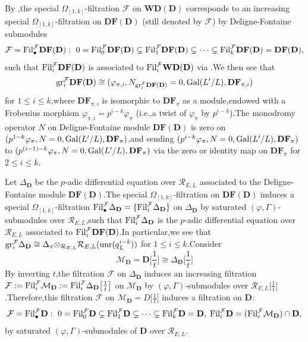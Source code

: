 \documentclass[SecEq,CM,GP]{degruyter-crelle} %
\theoremstyle{plain}
\newcommand{\df}{{\mathbf{DF}}}
\newcommand{\Dpik}{{\mathbf{D}}}
\newcommand{\fil}{{\rm Fil}}
\newcommand{\gal}{{\rm Gal}}
\newcommand{\gr}{{\rm gr}}
\newcommand{\omepik}{\Omega_{[1,k]}}
\newcommand{\tee}{{{\otimes}_{\cR_{E,L}}}}
\newcommand{\unr}{{\rm unr}}
\newcommand{\wdre}{{\textbf{WD}}}
\newcommand{\cR}{\mathcal R}
\newcommand{\cM}{\mathcal M}
\newcommand{\cF}{\mathcal F}
\begin{document}
By \cite[Proposition 4.1]{breuil2007first},\;the special $\omepik$-filtration $\cF$ on $\wdre(\Dpik)$ corresponds to an increasing  special  $\omepik$-filtration on $\df(\Dpik)$ (still denoted by $\cF$)  by Deligne-Fontaine submodules
\[\cF=\fil_{\bullet}^{\cF}\df(\Dpik): \ 0 =\fil_0^{\cF} \df(\Dpik) \subsetneq \fil_1^{\cF} \df(\Dpik) \subsetneq \cdots \subsetneq \fil_{k}^{\cF} \df(\Dpik)=\df(\Dpik),\]
such that $\fil_i^{\cF} \df(\Dpik)$ is associated to $\fil_i^{\cF} \wdre(\Dpik)$ via 
\cite[Proposition 4.1]{breuil2007first}.\;We then  see that \[\gr^{\cF}_i\df(\Dpik)\cong (\varphi_{\pi,i},N_{\gr^{\cF}_i\df(\Dpik)}=0,\gal(L'/L),\df_{\pi,i})\] for $1\leqslant i\leqslant k$,\;where $\df_{\pi,i}$ is isomorphic to $\df_\pi$ as a module,\;endowed with a Frobenius morphism $\varphi_{\pi,i}=p^{i-k}\varphi_\pi$ (i.e.,\;a twist of $\varphi_\pi$ by $p^{i-k}$).\;The monodromy operator $N$ on Deligne-Fontaine module $\df(\Dpik)$ is zero on  $(p^{1-k}\varphi_\pi,N=0,\gal(L'/L),\df_\pi)$,\;and sending $(p^{i-k}\varphi_\pi,N=0,\gal(L'/L),\df_\pi)$ to
$(p^{(i-1)-k}\varphi_\pi,N=0,\gal(L'/L),\df_\pi)$ via the zero or identity map on $\df_\pi$ for  $2\leq i\leq k$.\;




Let  ${\Delta_\Dpik}$  be the $p$-adic differential equation over $\cR_{E,L}$ associated to the Deligne-Fontaine module $\df(\Dpik)$.\;The special $\omepik$-filtration on $\df(\Dpik)$ induces a special  $\omepik$-filtration $\fil_{\bullet}^{\cF}{\Delta_\Dpik}=\{\fil_{i}^{\cF}{\Delta_\Dpik}\}$ on ${\Delta_\Dpik}$ by saturated $(\varphi,\Gamma)$-submodules over $\cR_{E,L}$,\;such that $\fil_{i}^{\cF}{\Delta_\Dpik}$ is the $p$-adic differential equation over $\cR_{E,L}$ associated to $\fil_i^{\cF} \df(\Dpik)$.\;In particular,\;we see that $\gr^{\cF}_i{\Delta_\Dpik}\cong {\Delta_\pi}\tee \cR_{E,L}(\unr(q_L^{i-k}))$ for $1\leqslant i\leqslant k$.\;Consider
\[\cM_\Dpik=\Dpik\big[\frac{1}{t}\big]\cong \Delta_\Dpik \big[\frac{1}{t}\big]\]
By inverting $t$,\;the filtration $\cF$ on $\Delta_\Dpik$ induces an increasing filtration $\cF:= \fil_{i}^{\cF}\cM_\Dpik:=\fil_{i}^{\cF}{\Delta_\Dpik}\big[\frac{1}{t}\big]$ on $\cM_\Dpik$ by $(\varphi,\Gamma)$-submodules over $\cR_{E,L}\big[\frac{1}{t}\big]$.\;Therefore,\;this filtration $\cF$ on $\cM_\Dpik=D\big[\frac{1}{t}\big]$ induces a filtration on $\Dpik$:
\[\cF=\fil_{\bullet}^{\cF}\Dpik: \ 0 =\fil_0^{\cF}\Dpik \subsetneq \fil_1^{\cF}\Dpik \subsetneq \cdots \subsetneq \fil_{k}^{\cF} \Dpik=\Dpik,\;\fil_i^{\cF}\Dpik=(\fil_{i}^{\cF}\cM_\Dpik)\cap \Dpik,\]
by saturated $(\varphi,\Gamma)$-submodules of $\Dpik$ over $\cR_{E,L}$.\;
\end{document}
